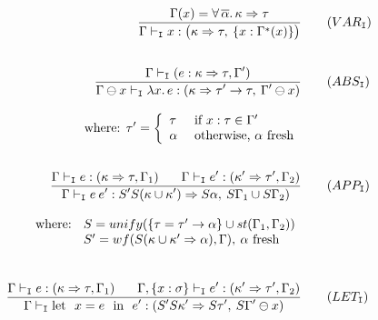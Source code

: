 \begin{figure}[h]
\begin{align}
       \displaystyle \frac{\Gamma(x) = \forall\,\overline{\alpha}.\,\kappa\Rightarrow\tau }
            {\Gamma \vdash_{\texttt{I}} x: \bigl(\kappa\Rightarrow\tau,\: \{x:\Gamma^*(x)\} \bigr)} 
         & \tag{$VAR_{\texttt{I}}$} \\[.6cm]
       \frac{\displaystyle \Gamma \vdash_{\texttt{I}} (e: \kappa\Rightarrow\tau, \Gamma')}
            {\displaystyle \Gamma \ominus x \vdash_{\texttt{I}} \lambda x.\,e: (\kappa\Rightarrow\tau' \rightarrow \tau,\: 
                                                                   \Gamma' \ominus x)} & \tag{$ABS_{\texttt{I}}$} \\[.3cm]
       \text{where: } \tau' = \left\{ \begin{array}{ll}
                          \tau   & \text{ if } x:\tau \in \Gamma'\\
                          \alpha & \text{ otherwise, $\alpha$ fresh}
                       \end{array}\right. & \notag \\[.6cm]
       \frac{\displaystyle \Gamma \vdash_{\texttt{I}} e: (\kappa\Rightarrow\tau, \Gamma_1) \:\:\:\:\:\:\:\:
                           \Gamma \vdash_{\texttt{I}} e': (\kappa'\Rightarrow\tau', \Gamma_2) } 
            {\displaystyle \Gamma \vdash_{\texttt{I}} e\:e': S' S(\kappa \cup \kappa')\Rightarrow S \alpha,\:
                                                   S\Gamma_1\cup S\Gamma_2)} & \tag{$APP_{\texttt{I}}$}\\[.3cm]
       \text{where: }
           \begin{array}[t]{l}
             S = unify(\{\tau = \tau'\rightarrow\alpha\} \cup st(\Gamma_1,\Gamma_2))\\
             S' = wf(S(\kappa \cup \kappa'\Rightarrow \alpha), \Gamma),\: \alpha \text{ fresh}
           \end{array} & \notag \\[.8cm]
       \frac{\displaystyle \Gamma \vdash_{\texttt{I}} e: (\kappa\Rightarrow\tau,\Gamma_1)   \:\:\:\:\:\:\:\:  
                           \Gamma, \{x:\sigma\} \vdash_{\texttt{I}} e': (\kappa'\Rightarrow\tau',\Gamma_2) }
            {\displaystyle \Gamma \vdash_{\texttt{I}} \text{let }\ x=e\ \text{ in }\ e': (S' S\kappa'\Rightarrow S\tau',\: 
                                                                   S\Gamma' \ominus x)} & \tag{$LET_{\texttt{I}}$} \\[.3cm]

\end{align}
\end{figure}
